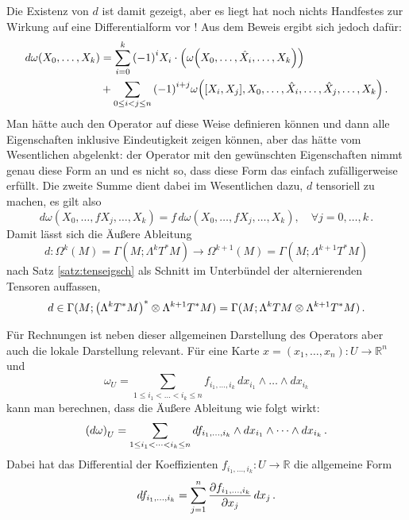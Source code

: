 \documentclass[../H_Analysis_main.tex]{subfiles}
\begin{document}
Die Existenz von $d$ ist damit gezeigt, aber es liegt hat noch nichts Handfestes zur Wirkung auf eine Differentialform vor ! Aus dem Beweis ergibt sich jedoch dafür:
\begin{equation}\label{eq:aeussdiff}
\begin{split}
d\omega(X_0, \dots, X_k) &= \sum_{i = 0}^k \qty(-1)^i X_i \cdot \qty(\omega\qty(X_0, \dots, \hat{X}_i, \dots, X_k)) 
\\
&+ \sum_{0 \leq i < j \leq n} \qty(-1)^{i + j} \omega\qty(\qty[X_i, X_j], X_0, \dots, \hat{X}_i, \dots, \hat{X}_j, \dots, X_k) \, .
\end{split}
\end{equation}
Man hätte auch den Operator auf diese Weise definieren können und dann alle Eigenschaften inklusive Eindeutigkeit zeigen können, aber das hätte vom Wesentlichen abgelenkt: der Operator mit den gewünschten Eigenschaften nimmt genau diese Form an und es nicht so, dass diese Form das einfach zufälligerweise erfüllt. Die zweite Summe dient dabei im Wesentlichen dazu, $d$ tensoriell zu machen, es gilt also
\begin{equation*}
d\omega(X_0, \dots, fX_j, \dots, X_k) = f \, d\omega(X_0, \dots, fX_j, \dots, X_k), \quad \forall j = 0, \dots, k \, .
\end{equation*}
Damit lässt sich die Äußere Ableitung
\begin{equation*}
d: \Omega^k(M) = \Gamma(M; \Lambda^k T^*M) \rightarrow \Omega^{k + 1}(M) = \Gamma(M; \Lambda^{k + 1} T^*M)
\end{equation*}
nach Satz \ref{satz:tenseigsch} als Schnitt im Unterbündel der alternierenden Tensoren auffassen,
\begin{equation}
d \in \Gamma(M; \qty(\Lambda^k T^*M)^* \otimes \Lambda^{k + 1} T^*M) = \Gamma(M; \Lambda^k TM \otimes \Lambda^{k + 1} T^*M) \, .
\end{equation}


Für Rechnungen ist neben dieser allgemeinen Darstellung des Operators aber auch die lokale Darstellung relevant. Für eine Karte $x = (x_1, \dots, x_n): U \rightarrow \mathbb{R}^n$ und
\begin{equation*}
\omega_U = \sum_{1 \leq i_1 < \dots < i_k \leq n} f_{i_1, \dots, i_k} \, dx_{i_1} \wedge \dots \wedge dx_{i_k}
\end{equation*}
kann man berechnen, dass die Äußere Ableitung wie folgt wirkt:
\begin{equation}
\qty(d\omega)_U = \sum_{1 \leq i_1 < \dots < i_k \leq n} df_{i_1, \dots, i_k} \wedge dx_{i_1} \wedge \dots \wedge dx_{i_k} \, .
\end{equation}
Dabei hat das Differential der Koeffizienten $f_{i_1, \dots, i_k}: U \rightarrow \mathbb{R}$ die allgemeine Form
\begin{equation*}
df_{i_1, \dots, i_k} = \sum_{j = 1}^n \pdv{f_{i_1, \dots, i_k}}{x_j} \, dx_j \, .
\end{equation*}
\end{document}
